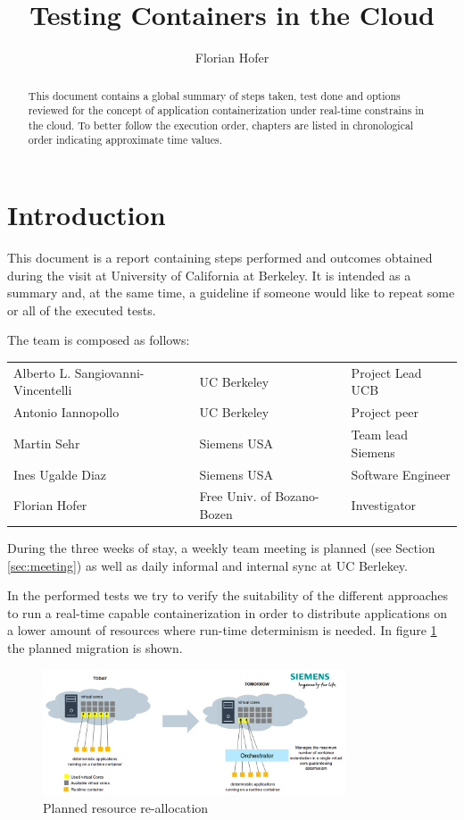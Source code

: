 \documentclass[]{scrartcl}
\title{Testing Containers in the Cloud}
\author{Florian Hofer}
\date{}
\begin{document}
\maketitle

\begin{abstract}
	This document contains a global summary of steps taken, test done and options reviewed for the concept of application containerization under real-time constrains in the cloud. To better follow the execution order, chapters are listed in chronological order indicating approximate time values.
\end{abstract}

\section{Introduction}

This document is a report containing steps performed and outcomes obtained during the visit at University of California at Berkeley. It is intended as a summary and, at the same time, a guideline if someone would like to repeat some or all of the executed tests.

The team is composed as follows:

\begin{table}[H]
	\begin{tabular}{l l l}
		Alberto L. Sangiovanni-Vincentelli & UC Berkeley & Project Lead UCB \\
		Antonio Iannopollo & UC Berkeley & Project peer \\
		Martin Sehr & Siemens USA & Team lead Siemens \\
		Ines Ugalde Diaz & Siemens USA & Software Engineer \\
		Florian Hofer & Free Univ. of Bozano-Bozen & Investigator \\		
	\end{tabular}
\end{table}

During the three weeks of stay, a weekly team meeting is planned (see Section \ref{sec:meeting}) as well as daily informal and internal sync at UC Berlekey.

In the performed tests we try to verify the suitability of the different approaches to run a real-time capable containerization in order to distribute applications on a lower amount of resources where run-time determinism is needed. In figure \ref{fig:plan} the planned migration is shown. 

\begin{figure}
	\centering
	\includegraphics[width=0.8\textwidth]{plan}
	\caption{Planned resource re-allocation}
	\label{fig:plan}
\end{figure}
\end{document}
